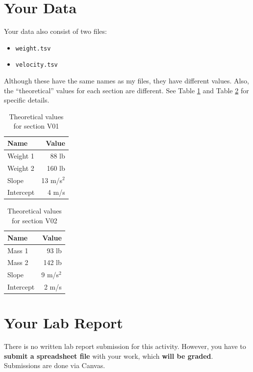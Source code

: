 \section{Your Data}
Your data also consist of two files:
\begin{itemize}
    \item \texttt{weight.tsv}
    \item \texttt{velocity.tsv}
\end{itemize}
Although these have the same names as my files, they have different values. Also, the ``theoretical'' values for each section are different. See Table \ref{table:00.theoretical.v01} and Table \ref{table:00.theoretical.v02} for specific details.
\begin{table}
    \centering
    \begin{tabular}{|l|r|}
        \hline
        \textbf{Name} & \textbf{Value} \\
        \hline
        Weight 1 & 88 lb \\
        Weight 2 & 160 lb \\
        \hline
        Slope & 13 m/s$^{2}$ \\
        Intercept & 4 m/s \\
        \hline
    \end{tabular}
    \caption{Theoretical values for section V01}
    \label{table:00.theoretical.v01}
\end{table}
\begin{table}
    \centering
    \begin{tabular}{|l|r|}
        \hline
        \textbf{Name} & \textbf{Value} \\
        \hline
        Mass 1 & 93 lb \\
        Mass 2 & 142 lb \\
        \hline
        Slope & 9 m/s$^{2}$ \\
        Intercept & 2 m/s \\
        \hline
    \end{tabular}
    \caption{Theoretical values for section V02}
    \label{table:00.theoretical.v02}
\end{table}
\section{Your Lab Report}
There is no written lab report submission for this activity. However, you have to \textbf{submit a spreadsheet file} with your work, which \textbf{will be graded}. Submissions are done via Canvas.

